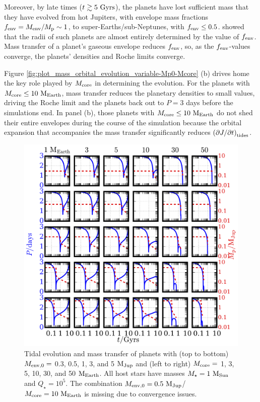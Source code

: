 \documentclass{svjour3}                     %
\begin{document}
Moreover, by late times ($t \gtrsim 5\ {\rm Gyrs}$), the planets have lost sufficient mass that they have evolved from hot Jupiters, with envelope mass fractions $f_{\rm env} = M_{\rm env}/M_{\rm p} \sim 1$, to super-Earths/sub-Neptunes, with $f_{\rm env} \le 0.5$. \cite{Lopez2014Understanding} showed that the radii of such planets are almost entirely determined by the value of $f_{\rm env}$. Mass transfer of a planet's gaseous envelope reduces $f_{\rm env}$, so, as the $f_{\rm env}$-values converge, the planets' densities and Roche limits converge. 

Figure \ref{fig:plot_mass_orbital_evolution_variable-Mp0-Mcore} (b) drives home the key role played by $M_{\rm core}$ in determining the evolution. For the planets with $M_{\rm core} \le 10\ {\rm M_{Earth}}$, mass transfer reduces the planetary densities to small values, driving the Roche limit and the planets back out to $P = 3$ days before the simulations end. In panel (b), those planets with $M_{\rm core} \le 10\ {\rm M_{Earth}}$ do not shed their entire envelopes during the course of the simulation because the orbital expansion that accompanies the mass transfer significantly reduces $\left( \partial J/\partial t \right)_{\rm tides}$. 

\begin{figure}
\includegraphics[width=\textwidth]{plot_mass_orbit_evolution_grid_qs5}
\caption{Tidal evolution and mass transfer of planets with (top to bottom) $M_{\rm env, 0} =$ 0.3, 0.5, 1, 3, and 5 ${\rm M_{Jup}}$ and (left to right) $M_{\rm core} =$ 1, 3, 5, 10, 30, and 50 ${\rm M_{Earth}}$. All host stars have masses $M_\star = 1\ {\rm M_{Sun}}$ and $Q_\star = 10^5$. The combination $M_{\rm env, 0} = 0.5\ {\rm M_{Jup}}$/$M_{\rm core} = 10\ {\rm M_{Earth}}$ is missing due to convergence issues.}
\label{fig:plot_mass_orbit_evolution_grid_qs5}
\end{figure}
\end{document}
